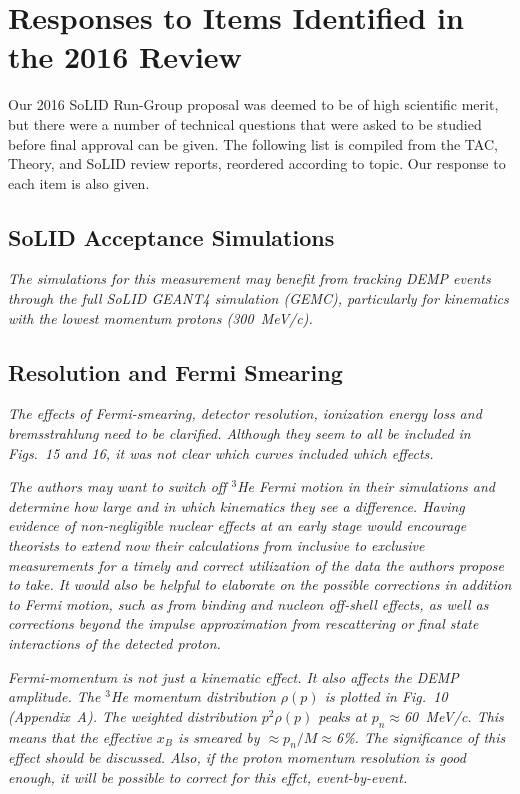 \section{Responses to Items Identified in the 2016 Review}

Our 2016 SoLID Run-Group proposal was deemed to be of high scientific merit,
but there were a number of technical questions that were asked to be studied
before final approval can be given.  The following list is compiled from the
TAC, Theory, and SoLID review reports, reordered according to topic.  Our 
response to each item is also given.

\subsection{SoLID Acceptance Simulations}

{\it The simulations for this measurement may benefit from tracking DEMP
  events through the full SoLID GEANT4 simulation (GEMC), particularly for
  kinematics with the lowest momentum protons (300~MeV/c).}

\subsection{Resolution and Fermi Smearing}

{\it The effects of Fermi-smearing, detector resolution, ionization energy
  loss and bremsstrahlung need to be clarified.  Although they seem to all be
  included in Figs.~15 and 16, it was not clear which curves included which
  effects.}

{\it The authors may want to switch off $^3$He Fermi motion in their
  simulations and determine how large and in which kinematics they see a
  difference.  Having evidence of non-negligible nuclear effects at an early
  stage would encourage theorists to extend now their calculations from
  inclusive to exclusive measurements for a timely and correct utilization of
  the data the authors propose to take.  It would also be helpful to elaborate
  on the possible corrections in addition to Fermi motion, such as from binding
  and nucleon off-shell effects, as well as corrections beyond the impulse
  approximation from rescattering or final state interactions of the detected
  proton.}

{\it Fermi-momentum is not just a kinematic effect.  It also affects the DEMP
  amplitude.  The $^3$He momentum distribution $\rho(p)$ is plotted in Fig.~10
  (Appendix~A).  The weighted distribution $p^2\rho(p)$ peaks at
  $p_n\approx$60~MeV/c.  This means that the effective $x_B$ is smeared by
  $\approx p_n/M\approx$6\%.  The significance of this effect should be
  discussed.  Also, if the proton momentum resolution is good enough, it will
  be possible to correct for this effct, event-by-event.}

